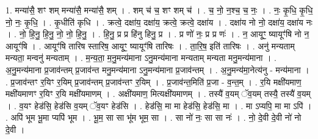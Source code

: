 \documentclass[17pt]{extarticle}
\begin{document}
1. मन्या॑सै॒ शꣳ शम् मन्या॑सै॒ मन्या॑सै॒ शम् । . शम् च॑ च॒ शꣳ शम् च॑ । . च॒ नो॒ न॒श्च॒ च॒ नः॒ । . नः॒ कृ॒धि॒ कृ॒धि॒ नो॒ नः॒ कृ॒धि॒ । . कृ॒धीति॑ कृधि । . क्रत्वे॒ दक्षा॑य॒ दक्षा॑य॒ क्रत्वे॒ क्रत्वे॒ दक्षा॑य । . दक्षा॑य नो नो॒ दक्षा॑य॒ दक्षा॑य नः । . नो॒ हि॒नु॒ हि॒नु॒ नो॒ नो॒ हि॒नु॒ । . हि॒नु॒ प्र प्र हि॑नु हिनु॒ प्र । . प्र णो॑ नः॒ प्र प्र णः॑ । . न॒ आयूꣳ॒॒ ष्यायूꣳ॑षि नो न॒ आयूꣳ॑षि । . आयूꣳ॑षि तारिष स्तारिष॒ आयूꣳ॒॒ ष्यायूꣳ॑षि तारिषः । . ता॒रि॒ष॒ इति॑ तारिषः । . अनु॑ मन्यताम् मन्यता॒ मन्वनु॑ मन्यताम् । . म॒न्य॒ता॒ म॒नु॒मन्य॑माना ऽनु॒मन्य॑माना मन्यताम् मन्यता मनु॒मन्य॑माना । . अ॒नु॒मन्य॑माना प्र॒जाव॑न्तम् प्र॒जाव॑न्त मनु॒मन्य॑माना ऽनु॒मन्य॑माना प्र॒जाव॑न्तम् । . अ॒नु॒मन्य॑मा॒नेत्य॑नु - मन्य॑माना । . प्र॒जाव॑न्तꣳ र॒यिꣳ र॒यिम् प्र॒जाव॑न्तम् प्र॒जाव॑न्तꣳ र॒यिम् । . प्र॒जाव॑न्त॒मिति॑ प्र॒जा - व॒न्त॒म् । . र॒यि मक्षी॑यमाण॒ मक्षी॑यमाणꣳ र॒यिꣳ र॒यि मक्षी॑यमाणम् । . अक्षी॑यमाण॒ मित्यक्षी॑यमाणम् । . तस्यै॑ व॒यम् ॅव॒यम् तस्यै॒ तस्यै॑ व॒यम् । . व॒यꣳ हेड॑सि॒ हेड॑सि व॒यम् ॅव॒यꣳ हेड॑सि । . हेड॑सि॒ मा मा हेड॑सि॒ हेड॑सि॒ मा । . मा ऽप्यपि॒ मा मा ऽपि॑ । . अपि॑ भूम भू॒मा प्यपि॑ भूम । . भू॒म॒ सा सा भू॑म भूम॒ सा । . सा नो॑ नः॒ सा सा नः॑ । . नो॒ दे॒वी दे॒वी नो॑ नो दे॒वी । \newline
\end{document}
